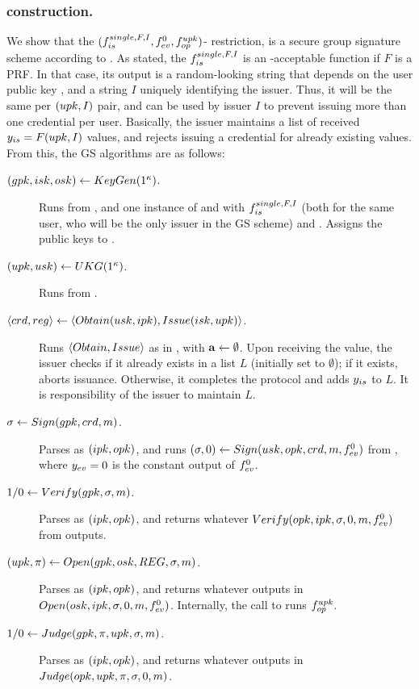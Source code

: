 \subsubsection{\CUASGS construction.} %
We show that the $(f_{is}^{single,F,I},f_{ev}^0,f_{op}^{upk})$-\CUASGen
restriction, is a secure group signature scheme according to \cite{bsz05}.
As stated, the $f_{is}^{single,F,I}$ is an \UAS-acceptable function if $F$ is a
PRF. In that case, its output is a random-looking string that depends on the
user public key \upk, and a string $I$ uniquely identifying the issuer. Thus, it
will be the same per $(upk,I)$ pair, and can be used by issuer $I$ to prevent
issuing more than one credential per user. Basically, the issuer maintains a
list of received $y_{is} = F(upk,I)$ values, and rejects issuing a credential
for already existing \yissue values. From this, the GS algorithms are as
follows:

\begin{description}
\item[$(gpk,isk,osk) \gets KeyGen(1^\kappa)$.] Runs \Setup from \CUASGen,
  and one instance of \KeyGen and \ISet with $f_{is}^{single,F,I}$ (both for
  the same user, who will be the only issuer in the GS scheme) and \OKeyGen.
  Assigns the public keys to \gpk.
\item[$(upk,usk) \gets UKG(1^\kappa)$.] Runs \KeyGen from \CUASGen.
\item[$\langle crd,reg \rangle \gets
  \langle Obtain(usk,ipk),Issue(isk,upk)\rangle$.] Runs $\langle Obtain,
  Issue\rangle$ as in \CUASGen, with $\mathbf{a} \gets \emptyset$. Upon receiving
  the \yissue value, the issuer checks if it already exists in a list $L$
  (initially set to $\emptyset$); if it exists, aborts issuance. Otherwise, it
  completes the protocol and adds $y_{is}$ to $L$. It is responsibility of the
  issuer to maintain $L$.
\item[$\sigma \gets Sign(gpk,crd,m)$.] Parses \gpk as $(ipk,opk)$, and
  runs $(\sigma,0) \gets Sign(usk,opk,crd,m,f_{ev}^0)$ from \CUASGen,
  where $y_{ev} = 0$ is the constant output of $f_{ev}^0$.
\item[$1/0 \gets Verify(gpk,\sigma,m)$.] Parses \gpk as $(ipk,opk)$, and
  returns whatever $Verify(opk,ipk,\sigma,0,m,f_{ev}^0)$ from \CUASGen
  outputs.
\item[$(\upk,\pi) \gets \Open(\gpk,\osk,\trans,\sig,\msg)$.] Parses \gpk as
  $(ipk,opk)$, and returns whatever \CUASGen outputs in $Open(osk,ipk,\sigma,
  0,m,f_{ev}^0)$. Internally, the call to \Open runs $f_{op}^{upk}$.
\item[$1/0 \gets Judge(gpk,\pi,upk,\sigma,m)$.] Parses \gpk as $(ipk,
  opk)$, and returns whatever \CUASGen outputs in $Judge(opk,upk,\pi,\sigma,
  0,m)$.
\end{description}

